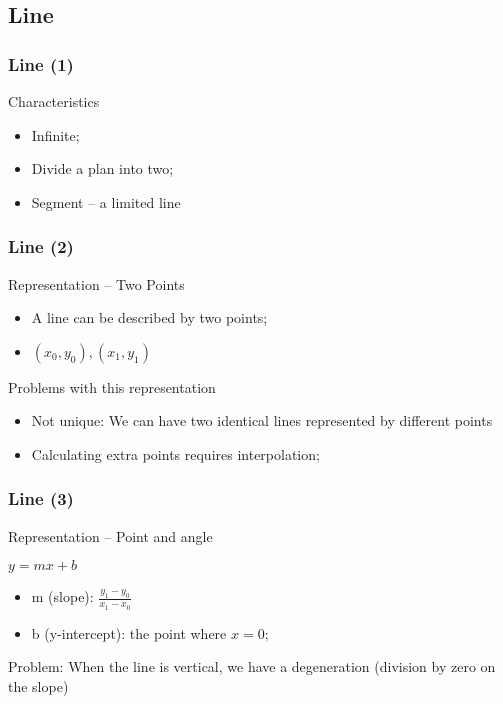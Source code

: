 \documentclass{beamer}
\begin{document}
\subsection{Line}

\begin{frame}
  \frametitle{Line (1)}
  
  \begin{block}{Characteristics}
    \begin{itemize}
    \item Infinite;
    \item Divide a plan into two;
    \item Segment -- a limited line
    \end{itemize}
  \end{block}
\end{frame}

\begin{frame}
  \frametitle{Line (2)}
  \begin{block}{Representation  -- Two Points}
    \begin{itemize}
      \item A line can be described by two points; 
      \item $(x_0,y_0),(x_1,y_1)$
    \end{itemize}
  \end{block}

  \begin{block}{Problems with this representation}
    \begin{itemize}
    \item Not unique: We can have two identical lines represented by different points
    \item Calculating extra points requires interpolation;
    \end{itemize}
  \end{block}

\end{frame}

\begin{frame}
  \frametitle{Line (3)}
  \begin{block}{Representation -- Point and angle}
    \begin{center}
      $ y = mx + b$
    \end{center}
    \medskip

    \begin{itemize}
    \item m (slope): $\frac{y_1 - y_0}{x_1 - x_0}$
    \item b (y-intercept): the point where $x = 0$;
    \end{itemize}
  \end{block}

  \bigskip
  
  Problem: When the line is vertical, we have a degeneration (division by zero on the slope) 
\end{frame}
\end{document}
